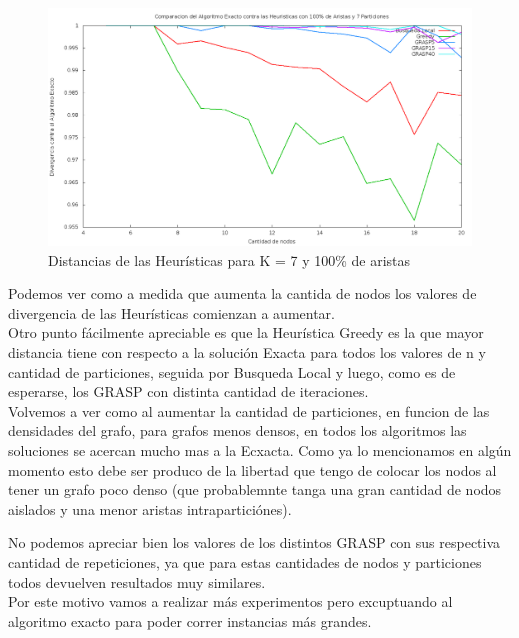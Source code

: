 \begin{figure}[H]
\begin{center}
\includegraphics[scale=0.3]{finales/ComparacionesCon7Particiones100Aristas.png}
\caption{Distancias de las Heur\'isticas para K = 7 y 100\% de aristas}
\end{center}
\end{figure}



Podemos ver como a medida que aumenta la cantida de nodos los valores de divergencia de las Heur\'isticas comienzan a aumentar.\\

Otro punto f\'acilmente apreciable es que la Heur\'istica Greedy es la que mayor distancia tiene con respecto a la soluci\'on Exacta para todos los valores de n y cantidad de particiones, seguida por Busqueda Local y luego, como es de esperarse, los GRASP con distinta cantidad de iteraciones.\\

Volvemos a ver como al aumentar la cantidad de particiones, en funcion de las densidades del grafo, para grafos menos densos, en todos los algoritmos las soluciones se acercan mucho mas a la Ecxacta. Como ya lo mencionamos en alg\'un momento esto debe ser produco de la libertad que tengo de colocar los nodos al tener un grafo poco denso (que probablemnte tanga una gran cantidad de nodos aislados y una menor aristas intrapartici\'ones).

No podemos apreciar bien los valores de los distintos GRASP con sus respectiva cantidad de repeticiones, ya que para estas cantidades de nodos y particiones todos devuelven resultados muy similares.\\
Por este motivo vamos a realizar m\'as experimentos pero excuptuando al algoritmo exacto para poder correr instancias m\'as grandes.


